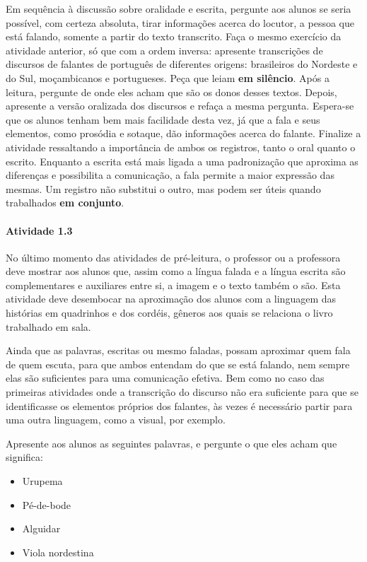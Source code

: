 \documentclass[11pt]{extarticle}
\begin{document}
Em sequência à discussão sobre oralidade e escrita, pergunte aos alunos se seria possível,
com certeza absoluta, tirar informações acerca do locutor, a pessoa que está falando, 
somente a partir do texto transcrito. Faça o mesmo exercício da atividade anterior, 
só que com a ordem inversa: apresente transcrições de discursos de falantes de português de diferentes
origens: brasileiros do Nordeste e do Sul, moçambicanos e portugueses. Peça que leiam \textbf{em silêncio}. 
Após a leitura, pergunte de onde eles acham que são os donos desses textos. 
Depois, apresente a versão oralizada dos discursos e refaça a mesma pergunta. 
Espera-se que os alunos tenham bem mais facilidade desta vez, já que a fala e seus elementos, 
como prosódia e sotaque, dão informações acerca do falante. 
Finalize a atividade ressaltando a importância de ambos os registros, tanto o oral quanto o escrito.
Enquanto a escrita está mais ligada a uma padronização que aproxima as diferenças
e possibilita a comunicação, a fala permite a maior expressão das mesmas. 
Um registro não substitui o outro, mas podem ser úteis quando trabalhados \textbf{em conjunto}.


\paragraph{Atividade 1.3}

No último momento das atividades de pré-leitura, o professor ou a professora deve 
mostrar aos alunos que, assim como a língua falada e a língua escrita são complementares
e auxiliares entre si, a imagem e o texto também o são. Esta atividade deve desembocar 
na aproximação dos alunos com a linguagem das histórias em quadrinhos e dos cordéis,
gêneros aos quais se relaciona o livro trabalhado em sala. 

Ainda que as palavras, escritas ou mesmo faladas, possam aproximar quem fala de quem escuta,
para que ambos entendam do que se está falando, nem sempre elas são suficientes para uma comunicação efetiva.
Bem como no caso das primeiras atividades onde a transcrição do discurso não era suficiente para que
se identificasse os elementos próprios dos falantes, às vezes é necessário partir para uma 
outra linguagem, como a visual, por exemplo. 

Apresente aos alunos as seguintes palavras, e pergunte o que eles acham que significa:

\begin{itemize}
\item Urupema
\item Pé-de-bode
\item Alguidar
\item Viola nordestina
\end{itemize}
\end{document}
